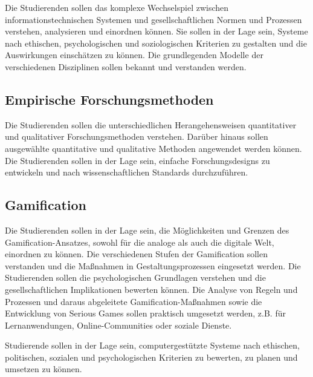 Die Studierenden sollen das komplexe Wechselspiel zwischen
informationstechnischen Systemen und gesellschaftlichen Normen und
Prozessen verstehen, analysieren und einordnen können. Sie sollen in der
Lage sein, Systeme nach ethischen, psychologischen und soziologischen
Kriterien zu gestalten und die Auswirkungen einschätzen zu können. Die
grundlegenden Modelle der verschiedenen Disziplinen sollen bekannt und
verstanden werden.

\subsection*{Empirische
Forschungsmethoden\label{/mi-2017/modulbeschreibungen-bachelor/BA_Vertiefung_SocialComputing}}\label{empirische-forschungsmethodenpathlabelmi-2017modulbeschreibungen-bachelorbaux5fvertiefungux5fsocialcomputing-1}

Die Studierenden sollen die unterschiedlichen Herangehensweisen
quantitativer und qualitativer Forschungsmethoden verstehen. Darüber
hinaus sollen ausgewählte quantitative und qualitative Methoden
angewendet werden können. Die Studierenden sollen in der Lage sein,
einfache Forschungsdesigns zu entwickeln und nach wissenschaftlichen
Standards durchzuführen.

\subsection*{Gamification\label{/mi-2017/modulbeschreibungen-bachelor/BA_Vertiefung_SocialComputing}}\label{gamificationpathlabelmi-2017modulbeschreibungen-bachelorbaux5fvertiefungux5fsocialcomputing-1}

Die Studierenden sollen in der Lage sein, die Möglichkeiten und Grenzen
des Gamification-Ansatzes, sowohl für die analoge als auch die digitale
Welt, einordnen zu können. Die verschiedenen Stufen der Gamification
sollen verstanden und die Maßnahmen in Gestaltungsprozessen eingesetzt
werden. Die Studierenden sollen die psychologischen Grundlagen verstehen
und die gesellschaftlichen Implikationen bewerten können. Die Analyse
von Regeln und Prozessen und daraus abgeleitete Gamification-Maßnahmen
sowie die Entwicklung von Serious Games sollen praktisch umgesetzt
werden, z.B. für Lernanwendungen, Online-Communities oder soziale
Dienste.

Studierende sollen in der Lage sein, computergestützte Systeme nach
ethischen, politischen, sozialen und psychologischen Kriterien zu
bewerten, zu planen und umsetzen zu können.

